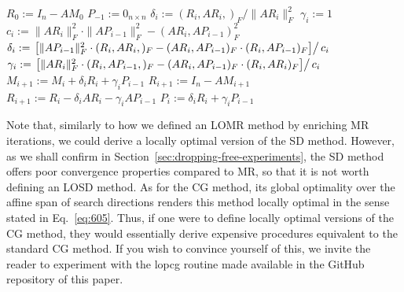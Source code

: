 \documentclass[numbers,webpdf,imanum]{ima-authoring-template}%
\theoremstyle{thmstyletwo}%
\numberwithin{equation}{section}
\begin{document}
\begin{algorithm}[ht]
\caption{LOMR($A$, $M_0$, $\texttt{ExplicitResidualUpdate}$)}
\label{algo:lomr}
\begin{algorithmic}[1]
\State $R_0:=I_n-AM_0$
\State $P_{-1}:=0_{n\times n}$
\State $\delta_i:=(R_i,AR_i,)_F/\|AR_i\|_F^2$
\State $\gamma_i:=1$
\Else
\State $c_i:=\|AR_i\|_F^2\cdot\|AP_{i-1}\|_F^2-(AR_i,AP_{i-1})_F^2$
\State $\delta_i:=\left.\left[\|AP_{i-1}\|_F^2\cdot(R_i,AR_i,)_F-(AR_i,AP_{i-1})_F\cdot(R_i,AP_{i-1})_F\right]\right/c_i$
\State $\gamma_i:=\left.\left[\|AR_i\|_F^2\cdot(R_i,AP_{i-1},)_F-(AR_i,AP_{i-1})_F\cdot(R_i,AR_i)_F\right]\right/c_i$
\EndIf
\State $M_{i+1}:=M_i+\delta_iR_i+\gamma_i P_{i-1}$
\State $R_{i+1}:=I_n-AM_{i+1}$
\Else
\State $R_{i+1}:=R_i-\delta_iAR_i-\gamma_iAP_{i-1}$
\EndIf
\State $P_{i}:=\delta_iR_{i}+\gamma_iP_{i-1}$
\EndFor
\end{algorithmic}
\end{algorithm}

Note that, similarly to how we defined an LOMR method by enriching MR iterations, we could derive a locally optimal version of the SD method.
However, as we shall confirm in Section~\ref{sec:dropping-free-experiments}, the SD method offers poor convergence properties compared to MR, so that it is not worth defining an LOSD method.
As for the CG method, its global optimality over the affine span of search directions renders this method locally optimal in the sense stated in Eq.~\eqref{eq:605}.
Thus, if one were to define locally optimal versions of the CG method, they would essentially derive expensive procedures equivalent to the standard CG method.
If you wish to convince yourself of this, we invite the reader to experiment with the lopcg routine made available in the GitHub repository of this paper.
\end{document}
